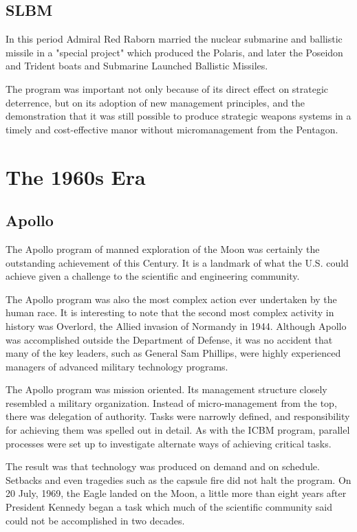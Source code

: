 \subsection{SLBM}
In this period Admiral Red Raborn married the nuclear submarine and ballistic missile in a "special project" which produced the Polaris, and later the Poseidon and Trident boats and Submarine Launched Ballistic Missiles.

The program was important not only because of its direct effect on strategic deterrence, but on its adoption of new management principles, and the demonstration that it was still possible to produce strategic weapons systems in a timely and cost-effective manor without micromanagement from the Pentagon.

\section{The 1960s Era}
\subsection{Apollo}
The Apollo program of manned exploration of the Moon was certainly the outstanding achievement of this Century. It is a landmark of what the U.S. could achieve given a challenge to the scientific and engineering community.

The Apollo program was also the most complex action ever undertaken by the human race. It is interesting to note that the second most complex activity in history was Overlord, the Allied invasion of Normandy in 1944. Although Apollo was accomplished outside the Department of Defense, it was no accident that many of the key leaders, such as General Sam Phillips, were highly experienced managers of advanced military technology programs.

The Apollo program was mission oriented. Its management structure closely resembled a military organization. Instead of micro-management from the top, there was delegation of authority. Tasks were narrowly defined, and responsibility for achieving them was spelled out in detail. As with the ICBM program, parallel processes were set up to investigate alternate ways of achieving critical tasks.

The result was that technology was produced on demand and on schedule. Setbacks and even tragedies such as the capsule fire did not halt the program. On 20 July, 1969, the Eagle landed on the Moon, a little more than eight years after President Kennedy began a task which much of the scientific community said could not be accomplished in two decades.

